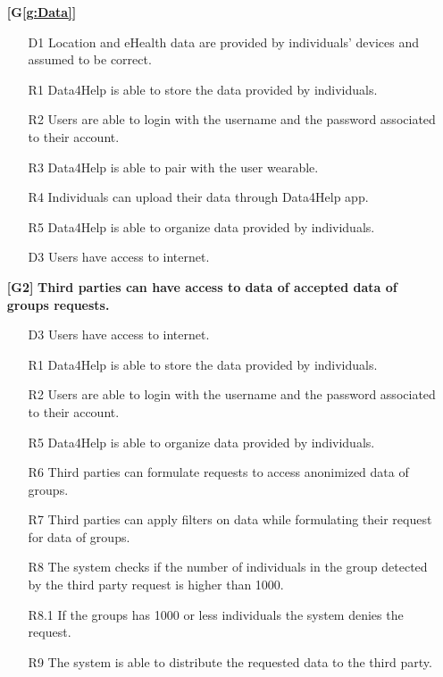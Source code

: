 \begin{enumerate}


\item[\textbf{[G\ref{g:Data}]}] \textbf{\goalData}

\begin{enumerate}

\item[D1] Location and eHealth data are provided by individuals' devices and assumed to be correct.
\item[R1] Data4Help is able to store the data provided by individuals.
\item[R2] Users are able to login with the username and the password associated to their account.
\item[R3] Data4Help is able to pair with the user wearable.
\item[R4] Individuals can upload their data through Data4Help app.
\item[R5] Data4Help is able to organize data provided by individuals.
\item[D3] Users have access to internet.



\end{enumerate}

\item[\textbf{[G2]}] \textbf{Third parties can have access to data of accepted data of groups requests.}

\begin{enumerate}

\item[D3] Users have access to internet.
\item[R1] Data4Help is able to store the data provided by individuals.
\item[R2] Users are able to login with the username and the password associated to their account.
\item[R5] Data4Help is able to organize data provided by individuals.
\item[R6] Third parties can formulate requests to access anonimized data of groups.
\item[R7] Third parties can apply filters on data while formulating their request for data of groups.
\item[R8] The system checks if the number of individuals in the group detected by the third party request is higher than 1000.
\item[R8.1] If the groups has 1000 or less individuals the system denies the request.
\item[R9] The system is able to distribute the requested data to the third party.




\end{enumerate}
\end{enumerate}
